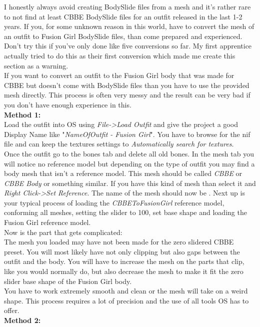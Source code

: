 I honestly always avoid creating BodySlide files from a mesh and it's rather rare to not find at least CBBE BodySlide files for an outfit 
released in the last 1-2 years. If you, for some unknown reason in this world, have to convert the mesh of an outfit to Fusion Girl BodySlide files,
than come prepared and experienced. Don't try this if you've only done like five conversions so far. My first apprentice actually 
tried to do this as their first conversion which made me create this section as a warning.\\
If you want to convert an outfit to the Fusion Girl body that was made for CBBE but doesn't come with BodySlide files than 
you have to use the provided mesh directly. This process is often very messy and the result can be very bad if you don't have
enough experience in this.\\
\textbf{Method 1:}\\
Load the outfit into OS using \textit{File->Load Outfit} and give the project a good Display Name like "\textit{NameOfOutfit - Fusion Girl}".
You have to browse for the nif file and can keep the textures settings to \textit{Automatically search for textures}.\\
Once the outfit go to the bones tab and delete all old bones. In the mesh tab you will notice no reference model but depending 
on the type of outfit you may find a body mesh that isn't a reference model. This mesh should be called \textit{CBBE} or \textit{CBBE Body} 
or something similar. If you have this kind of mesh than select it and \textit{Right Click->Set Reference}. The name of the mesh 
should now be {\color{green}{green}}. Next up is your typical process of loading the \textit{CBBEToFusionGirl} reference model, conforming 
all meshes, setting the slider to 100, set base shape and loading the Fusion Girl reference model.\\
Now is the part that gets complicated:\\
The mesh you loaded may have not been made for the zero slidered CBBE preset. You will most likely have not only clipping but also 
gaps between the outfit and the body. You will have to increase the mesh on the parts that clip, like you would normally do, but 
also decrease the mesh to make it fit the zero slider base shape of the Fusion Girl body.\\
You have to work extremely smooth and clean or the mesh will take on a weird shape. This process requires a lot of precision and the use 
of all tools OS has to offer.\\
\textbf{Method 2:}\\
